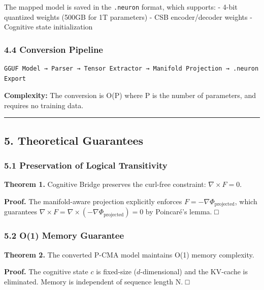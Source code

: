 \documentclass[
  11pt,
  a4paper,
]{article}
\begin{document}
The mapped model is saved in the \texttt{.neuron} format, which
supports: - 4-bit quantized weights (500GB for 1T parameters) - CSB
encoder/decoder weights - Cognitive state initialization

\subsubsection{4.4 Conversion Pipeline}\label{conversion-pipeline}

\begin{verbatim}
GGUF Model → Parser → Tensor Extractor → Manifold Projection → .neuron Export
\end{verbatim}

\textbf{Complexity:} The conversion is O(P) where P is the number of
parameters, and requires no training data.

\begin{center}\rule{0.5\linewidth}{0.5pt}\end{center}

\subsection{5. Theoretical Guarantees}\label{theoretical-guarantees}

\subsubsection{5.1 Preservation of Logical
Transitivity}\label{preservation-of-logical-transitivity}

\textbf{Theorem 1.} Cognitive Bridge preserves the curl-free constraint:
\(\nabla \times F = 0\).

\textbf{Proof.} The manifold-aware projection explicitly enforces
\(F = -\nabla\Phi_{\text{projected}}\), which guarantees
\(\nabla \times F = \nabla \times (-\nabla\Phi_{\text{projected}}) = 0\)
by Poincaré's lemma. □

\subsubsection{5.2 O(1) Memory Guarantee}\label{o1-memory-guarantee}

\textbf{Theorem 2.} The converted P-CMA model maintains O(1) memory
complexity.

\textbf{Proof.} The cognitive state \(c\) is fixed-size
(\(d\)-dimensional) and the KV-cache is eliminated. Memory is
independent of sequence length N. □
\end{document}
